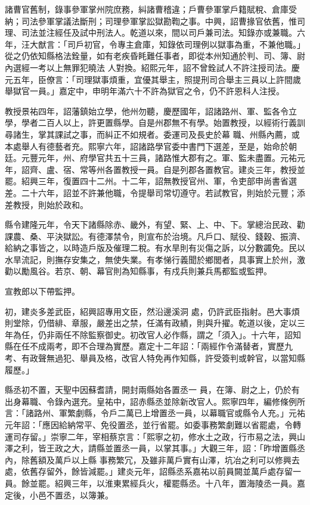 \begin{pinyinscope}
 諸曹官舊制，錄事參軍掌州院庶務，糾諸曹稽違；戶曹參軍掌戶籍賦稅、倉庫受納；司法參軍掌議法斷刑；司理參軍掌訟獄勘鞫之事。中興，詔曹掾官依舊，惟司理、司法並注經任及試中刑法人。乾道以來，間以司戶兼司法。知錄亦或兼職。六年，汪大猷言：「司戶初官，令專主倉庫，知錄依司理例以獄事為重，不兼他職。」從之仍依知縣格法銓量，如有老疾昏眊難任事者，即從本州知通於判、司、簿、尉內選經一考以上無罪犯曉法
 人對換。紹熙元年，詔不曾銓試人不許注授司法。慶元五年，臣僚言：「司理獄事煩重，宜優其舉主，照提刑司合舉主三員以上許間歲舉獄官一員。」嘉定中，申明年滿六十不許為獄官之令，仍不許恩科人注授。



 教授景祐四年，詔藩鎮始立學，他州勿聽，慶歷國年，詔諸路州、軍、監各令立學，學者二百人以上，許更置縣學。自是州郡無不有學。始置教授，以經術行義訓尋諸生，掌其課試之事，而糾正不如規者。委運司及長史於幕
 職、州縣內薦，或本處舉人有德藝者充。熙寧六年，詔諸路學官委中書門下選差，至是，始命於朝廷。元豐元年，州、府學官共五十三員，諸路惟大郡有之。軍、監未盡置。元祐元年，詔齊、盧、宿、常等州各置教授一員。自是列郡各置教官。建炎三年，教授並罷。紹興三年，復置四十二州。十二年，詔無教授官州、軍，令吏部申尚書省選差。二十六年，詔並不許兼他職，令提舉司常切遵守。若試教官，則始於元豐；添差教授，則始於政和。



 縣令建隆元年，令天下諸縣除赤、畿外，有望、緊、上、中、下。掌總治民政、勸課農、桑、平決獄訟。有德澤禁令，則宣布於治境。凡戶口、賦役、錢穀、振濟、給納之事皆之，以時造戶版及催理二稅。有水旱則有災傷之訴，以分數蠲免。民以水旱流記，則撫存安集之，無使失業。有孝悌行義聞於鄉閭者，具事實上於州，激勸以勵風谷。若京、朝、幕官則為知縣事，有戍兵則兼兵馬都監或監押。



 宣教郎以下帶監押。



 初，建炎多差武臣，紹興詔專用文臣，然沿邊溪洞
 處，仍許武臣指射。邑大事煩則堂除，仍借緋、章服，嚴差出之禁，任滿有政績，則與升擢。乾道以後，定以三年為任，仍非兩任不除監察御史。初改官人必作縣，謂之「須入」。十六年，詔知縣在任不成兩考，即不合理為實歷。嘉定十二年詔：「兩經作令滿替者，實歷九考、有政聲無過犯、舉員及格，改官人特免再作知縣，許受簽判或幹官，以當知縣履歷。」



 縣丞初不置，天聖中因蘇耆請，開封兩縣始各置丞一
 員，在簿、尉之上，仍於有出身幕職、令錄內選充。皇祐中，詔赤縣丞並除新改官人。熙寧四年，編修條例所言：「諸路州、軍繁劇縣，令戶二萬已上增置丞一員，以幕職官或縣令人充。」元祐元年詔：「應因給納常平、免役置丞，並行省罷。如委事務繁劇難以省罷處，令轉運司存留。」崇寧二年，宰相蔡京言：「熙寧之初，修水土之政，行市易之法，興山澤之利，皆王政之大，請縣並置丞一員，以掌其事。」大觀三年，詔：「昨增置縣丞內，除舊額及萬戶以上縣
 事務繁冗，及雖非萬戶實有山澤，坑冶之利可以修興去處，依舊存留外，餘皆減罷。」建炎元年，詔縣丞系嘉祐以前員闕並萬戶處存留一員。餘並罷。紹興三年，以淮東累經兵火，權罷縣丞。十八年，置海陵丞一員。嘉定後，小邑不置丞，以簿兼。




\end{pinyinscope}
